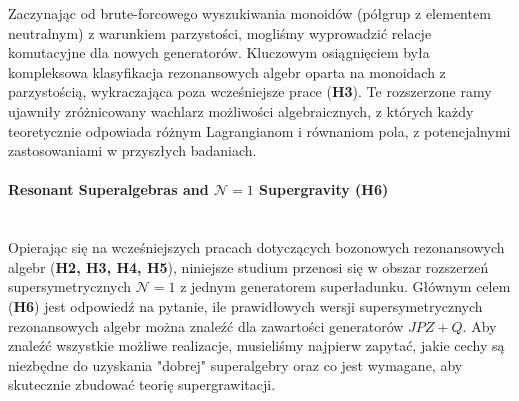 \documentclass[12pt,a4paper]{article}
\newcommand{\myparagraph}[1]{\paragraph{#1}\mbox{}\\}
\begin{document}
Zaczynając od brute-forcowego wyszukiwania monoidów (półgrup z elementem neutralnym) z warunkiem parzystości, mogliśmy wyprowadzić relacje komutacyjne dla nowych generatorów. Kluczowym osiągnięciem była kompleksowa klasyfikacja rezonansowych algebr oparta na monoidach z parzystością, wykraczająca poza wcześniejsze prace (\textbf{H3}). Te rozszerzone ramy ujawniły zróżnicowany wachlarz możliwości algebraicznych, z których każdy teoretycznie odpowiada różnym Lagrangianom i równaniom pola, z potencjalnymi zastosowaniami w przyszłych badaniach.

\myparagraph{Resonant Superalgebras and $\mathcal{N}=1$ Supergravity (H6)}

Opierając się na wcześniejszych pracach dotyczących bozonowych rezonansowych algebr (\textbf{H2, H3, H4, H5}), niniejsze studium przenosi się w obszar rozszerzeń supersymetrycznych $\mathcal{N}=1$ z jednym generatorem superładunku. Głównym celem (\textbf{H6}) jest odpowiedź na pytanie, ile prawidłowych wersji supersymetrycznych rezonansowych algebr można znaleźć dla zawartości generatorów $JPZ+Q$. Aby znaleźć wszystkie możliwe realizacje, musieliśmy najpierw zapytać, jakie cechy są niezbędne do uzyskania "dobrej" superalgebry oraz co jest wymagane, aby skutecznie zbudować teorię supergrawitacji.
\end{document}
